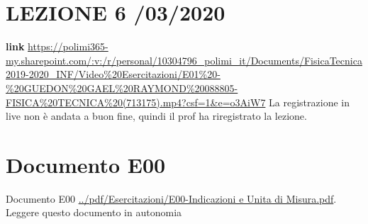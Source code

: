 \section*{LEZIONE 6 /03/2020}
\textbf{link} \url{https://polimi365-my.sharepoint.com/:v:/r/personal/10304796_polimi_it/Documents/FisicaTecnica2019-2020_INF/Video%20Esercitazioni/E01%20-%20GUEDON%20GAEL%20RAYMOND%20088805-FISICA%20TECNICA%20(713175).mp4?csf=1&e=o3AiW7}\newline
La registrazione in live non è andata a buon fine, quindi il prof ha riregistrato la lezione.
\section*{Documento E00}
Documento E00 \url{../pdf/Esercitazioni/E00-Indicazioni e Unita di Misura.pdf}.\newline
\newline
Leggere questo documento in autonomia
